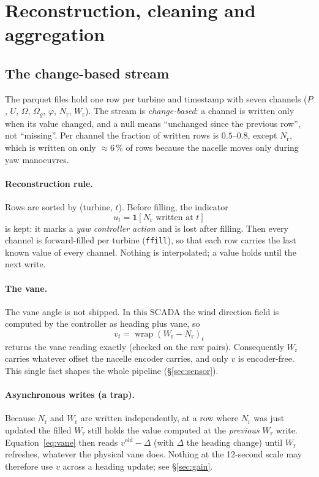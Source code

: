 \documentclass[11pt,a4paper]{article}
\theoremstyle{remark}
\newcommand{\wrap}{\operatorname{wrap}}
\newcommand{\code}[1]{\texttt{#1}}
\newcommand{\Wr}{W_{\mathrm{r}}}
\newcommand{\Nr}{N_{\mathrm{r}}}
\begin{document}
\section{Reconstruction, cleaning and aggregation}\label{sec:step1}
\subsection{The change-based stream}
The parquet files hold one row per turbine and timestamp with seven channels
($P$, $U$, $\Omega$, $\Omega_g$, $\varphi$, $\Nr$, $\Wr$). The stream is
\emph{change-based}: a channel is written only when its value changed, and a
null means ``unchanged since the previous row'', not ``missing''. Per channel
the fraction of written rows is $0.5$--$0.8$, except $\Nr$, which is written on
only $\approx6\,\%$ of rows because the nacelle moves only during yaw
manoeuvres.

\paragraph{Reconstruction rule.} Rows are sorted by (turbine, $t$). Before
filling, the indicator
\begin{equation}
  u_t = \mathbf 1[\Nr \text{ written at } t]
  \label{eq:nac_update}
\end{equation}
is kept: it marks a \emph{yaw controller action} and is lost after filling.
Then every channel is forward-filled per turbine (\code{ffill}), so that each
row carries the last known value of every channel. Nothing is interpolated;
a value holds until the next write.

\paragraph{The vane.} The vane angle is not shipped. In this SCADA the wind
direction field is computed by the controller as heading plus vane, so
\begin{equation}
  v_t = \wrap(\Wr - \Nr)_t
  \label{eq:vane}
\end{equation}
returns the vane reading exactly (checked on the raw pairs).
Consequently $\Wr$ carries whatever offset the nacelle encoder carries, and only
$v$ is encoder-free. This single fact shapes the whole pipeline
(\S\ref{sec:sensor}).

\paragraph{Asynchronous writes (a trap).} Because $\Nr$ and $\Wr$ are written
independently, at a row where $\Nr$ was just updated the filled $\Wr$ still holds
the value computed at the \emph{previous} $\Wr$ write. Equation~\eqref{eq:vane}
then reads $v^{\mathrm{old}} - \Delta$ (with $\Delta$ the heading change) until
$\Wr$ refreshes, whatever the physical vane does. Nothing at the 12-second
scale may therefore use $v$ across a heading update; see \S\ref{sec:gain}.
\end{document}
